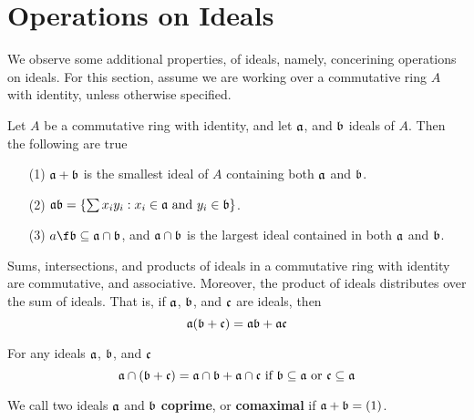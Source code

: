 \section{Operations on Ideals}

We observe some additional properties, of ideals, namely, concerining operations
on ideals. For this section, assume we are working over a commutative ring $A$
with identity, unless otherwise specified.

\begin{lemma}\label{1.9.1}
    Let $A$ be a commutative ring with identity, and let $\af$, and $\bf$ ideals
    of  $A$. Then the following are true
    \begin{enumerate}
        \item[(1)] $\af+\bf$ is the smallest ideal of $A$ containing both $\af$
            and  $\bf$.

        \item[(2)] $\af\bf=\{\sum{x_iy_i} : x_i \in \af \text{ and } y_i \in \bf\}$.

        \item[(3)] $a\f\bf \subseteq \af \cap \bf$, and $\af \cap \bf$ is the
            largest ideal contained in both $\af$ and $\bf$.
    \end{enumerate}
\end{lemma}

\begin{lemma}\label{1.9.2}
    Sums, intersections, and products of ideals in a commutative ring with
    identity are commutative, and associative. Moreover, the product of ideals
    distributes over the sum of ideals. That is, if $\af$, $\bf$, and $\cf$ are
    ideals, then
    \begin{equation*}
        \af(\bf+\cf)=\af\bf+\af\cf
    \end{equation*}
\end{lemma}

\begin{lemma}\label{1.9.3}
    For any ideals $\af$, $\bf$, and $\cf$
    \begin{equation*}
        \af \cap (\bf+\cf)=\af \cap \bf+\af \cap \cf \text{ if }
        \bf \subseteq \af \text{ or } \cf \subseteq \af
    \end{equation*}
\end{lemma}

\begin{definition}
    We call two ideals $\af$ and  $\bf$ \textbf{coprime}, or \textbf{comaximal}
    if $\af+\bf=(1)$.
\end{definition}

